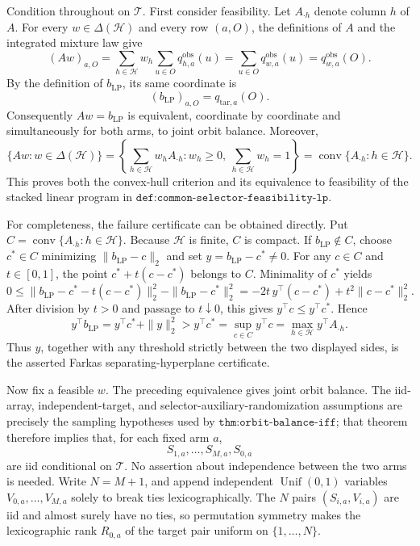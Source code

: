 Condition throughout on \(\mathcal T\). First consider feasibility. Let \(A_{\cdot h}\) denote column \(h\) of \(A\). For every \(w\in\Delta(\mathcal H)\) and every row \((a,O)\), the definitions of \(A\) and the integrated mixture law give
\[
(Aw)_{a,O}=\sum_{h\in\mathcal H}w_h\sum_{u\in O}q^{\mathrm{obs}}_{h,a}(u)=\sum_{u\in O}q^{\mathrm{obs}}_{w,a}(u)=q^{\mathrm{obs}}_{w,a}(O).
\]
By the definition of \(b_{\mathrm{LP}}\), its same coordinate is
\[
(b_{\mathrm{LP}})_{a,O}=q_{\mathrm{tar},a}(O).
\]
Consequently \(Aw=b_{\mathrm{LP}}\) is equivalent, coordinate by coordinate and simultaneously for both arms, to joint orbit balance. Moreover,
\[
\{Aw:w\in\Delta(\mathcal H)\}=\left\{\sum_{h\in\mathcal H}w_hA_{\cdot h}:w_h\ge0,\ \sum_{h\in\mathcal H}w_h=1\right\}=\operatorname{conv}\{A_{\cdot h}:h\in\mathcal H\}.
\]
This proves both the convex-hull criterion and its equivalence to feasibility of the stacked linear program in \(\texttt{def:common-selector-feasibility-lp}\).

For completeness, the failure certificate can be obtained directly. Put \(C=\operatorname{conv}\{A_{\cdot h}:h\in\mathcal H\}\). Because \(\mathcal H\) is finite, \(C\) is compact. If \(b_{\mathrm{LP}}\notin C\), choose \(c^*\in C\) minimizing \(\|b_{\mathrm{LP}}-c\|_2\) and set \(y=b_{\mathrm{LP}}-c^*\ne0\). For any \(c\in C\) and \(t\in[0,1]\), the point \(c^*+t(c-c^*)\) belongs to \(C\). Minimality of \(c^*\) yields
\[
0\le \|b_{\mathrm{LP}}-c^*-t(c-c^*)\|_2^2-\|b_{\mathrm{LP}}-c^*\|_2^2=-2t\,y^\top(c-c^*)+t^2\|c-c^*\|_2^2.
\]
After division by \(t>0\) and passage to \(t\downarrow0\), this gives \(y^\top c\le y^\top c^*\). Hence
\[
y^\top b_{\mathrm{LP}}=y^\top c^*+\|y\|_2^2>y^\top c^*=\sup_{c\in C}y^\top c=\max_{h\in\mathcal H}y^\top A_{\cdot h}.
\]
Thus \(y\), together with any threshold strictly between the two displayed sides, is the asserted Farkas separating-hyperplane certificate.

Now fix a feasible \(w\). The preceding equivalence gives joint orbit balance. The iid-array, independent-target, and selector-auxiliary-randomization assumptions are precisely the sampling hypotheses used by \(\texttt{thm:orbit-balance-iff}\); that theorem therefore implies that, for each fixed arm \(a\),
\[
S_{1,a},\ldots,S_{M,a},S_{0,a}
\]
are iid conditional on \(\mathcal T\). No assertion about independence between the two arms is needed. Write \(N=M+1\), and append independent \(\operatorname{Unif}(0,1)\) variables \(V_{0,a},\ldots,V_{M,a}\) solely to break ties lexicographically. The \(N\) pairs \((S_{i,a},V_{i,a})\) are iid and almost surely have no ties, so permutation symmetry makes the lexicographic rank \(R_{0,a}\) of the target pair uniform on \(\{1,\ldots,N\}\).

